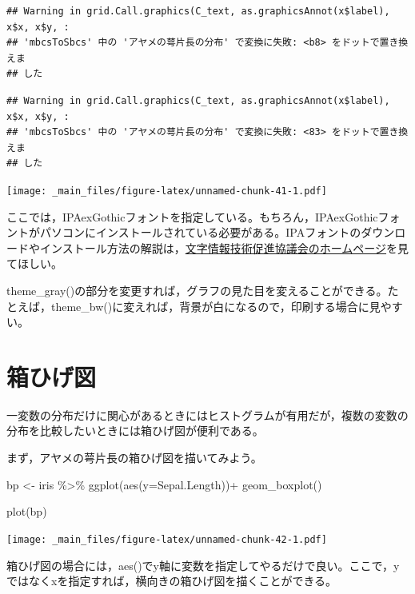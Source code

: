 \documentclass[
]{book}
\newenvironment{Shaded}{\begin{snugshade}}{\end{snugshade}}
\newcommand{\AttributeTok}[1]{\textcolor[rgb]{0.77,0.63,0.00}{#1}}
\newcommand{\FunctionTok}[1]{\textcolor[rgb]{0.00,0.00,0.00}{#1}}
\newcommand{\NormalTok}[1]{#1}
\newcommand{\OtherTok}[1]{\textcolor[rgb]{0.56,0.35,0.01}{#1}}
\newcommand{\SpecialCharTok}[1]{\textcolor[rgb]{0.00,0.00,0.00}{#1}}
\begin{document}
\begin{verbatim}
## Warning in grid.Call.graphics(C_text, as.graphicsAnnot(x$label), x$x, x$y, :
## 'mbcsToSbcs' 中の 'アヤメの萼片長の分布' で変換に失敗: <b8> をドットで置き換えま
## した
\end{verbatim}

\begin{verbatim}
## Warning in grid.Call.graphics(C_text, as.graphicsAnnot(x$label), x$x, x$y, :
## 'mbcsToSbcs' 中の 'アヤメの萼片長の分布' で変換に失敗: <83> をドットで置き換えま
## した
\end{verbatim}

\texttt{[image: \_main\_files/figure-latex/unnamed-chunk-41-1.pdf]}

ここでは，IPAexGothicフォントを指定している。もちろん，IPAexGothicフォントがパソコンにインストールされている必要がある。IPAフォントのダウンロードやインストール方法の解説は，\href{https://moji.or.jp/ipafont/}{文字情報技術促進協議会のホームページ}を見てほしい。

theme\_gray()の部分を変更すれば，グラフの見た目を変えることができる。たとえば，theme\_bw()に変えれば，背景が白になるので，印刷する場合に見やすい。

\hypertarget{ux7bb1ux3072ux3052ux56f3}{%
\section{箱ひげ図}\label{ux7bb1ux3072ux3052ux56f3}}

一変数の分布だけに関心があるときにはヒストグラムが有用だが，複数の変数の分布を比較したいときには箱ひげ図が便利である。

まず，アヤメの萼片長の箱ひげ図を描いてみよう。

\begin{Shaded}
\begin{Highlighting}[]
\NormalTok{bp }\OtherTok{\textless{}{-}}\NormalTok{ iris }\SpecialCharTok{\%\textgreater{}\%} 
  \FunctionTok{ggplot}\NormalTok{(}\FunctionTok{aes}\NormalTok{(}\AttributeTok{y=}\NormalTok{Sepal.Length))}\SpecialCharTok{+}
  \FunctionTok{geom\_boxplot}\NormalTok{()}

\FunctionTok{plot}\NormalTok{(bp)}
\end{Highlighting}
\end{Shaded}

\texttt{[image: \_main\_files/figure-latex/unnamed-chunk-42-1.pdf]}

箱ひげ図の場合には，aes()でy軸に変数を指定してやるだけで良い。ここで，yではなくxを指定すれば，横向きの箱ひげ図を描くことができる。
\end{document}
